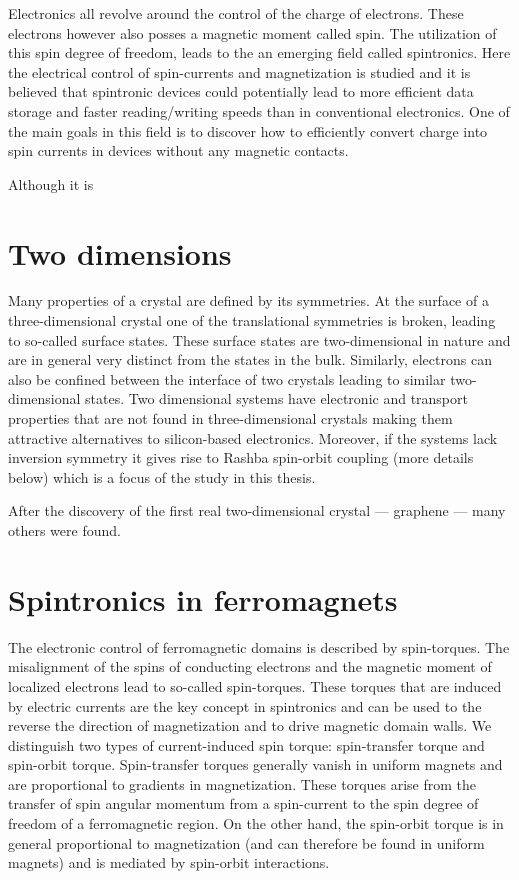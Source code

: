 Electronics all revolve around the control of the charge of electrons. These electrons however also posses a magnetic moment called spin. The utilization of this spin degree of freedom, leads to the an emerging field called spintronics. Here the electrical control of spin-currents and magnetization is studied and it is believed that spintronic devices could potentially lead to more efficient data storage and faster reading/writing speeds than in conventional electronics. One of the main goals in this field is to discover how to efficiently convert charge into spin currents in devices without any magnetic contacts. 

Although it is 

\section{Two dimensions}
Many properties of a crystal are defined by its symmetries. At the surface of a three-dimensional crystal one of the translational symmetries is broken, leading to so-called surface states. These surface states are two-dimensional in nature and are in general very distinct from the states in the bulk. Similarly, electrons can also be confined between the interface of two crystals leading to similar two-dimensional states. Two dimensional systems have electronic and transport properties that are not found in three-dimensional crystals making them attractive alternatives to silicon-based electronics. Moreover, if the systems lack inversion symmetry it gives rise to Rashba spin-orbit coupling (more details below) which is a focus of the study in this thesis. 

After the discovery of the first real two-dimensional crystal --- graphene --- many others were found. 
\section{Spintronics in ferromagnets}
The electronic control of ferromagnetic domains is described by spin-torques. The misalignment of the spins of conducting electrons and the magnetic moment of localized electrons lead to so-called spin-torques. These torques that are induced by electric currents are the key concept in spintronics and can be used to the reverse the direction of magnetization and to drive magnetic domain walls. We distinguish two types of current-induced spin torque: spin-transfer torque and spin-orbit torque. Spin-transfer torques generally vanish in uniform magnets and are proportional to gradients in magnetization. These torques arise from the transfer of spin angular momentum from a spin-current to the spin degree of freedom of a ferromagnetic region.  On the other hand, the spin-orbit torque is in general proportional to magnetization (and can therefore be found in uniform magnets) and is mediated by spin-orbit interactions. 

